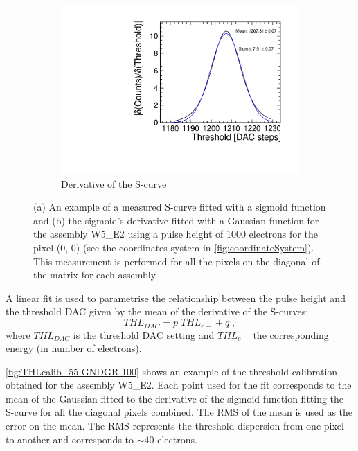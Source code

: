 \begin{figure}[htbp]
\begin{subfigure}[b]{0.45\textwidth}
    \includegraphics[width=\textwidth]{./figures/Calibration/W5_E2_deriv_scurve_ampl1.pdf}
    \caption{Derivative of the S-curve}
    \label{fig:deriv_example}
  \end{subfigure}
  \caption{(a) An example of a measured S-curve fitted with a sigmoid
    function and (b) the sigmoid's derivative fitted with a Gaussian
    function for the assembly W5\_E2 using a pulse height of 1000
    electrons for the pixel (0, 0) (see the coordinates system in
    \cref{fig:coordinateSystem}). This measurement is performed for
    all the pixels on the diagonal of the matrix for each assembly.}
  \label{fig:scurve_deriv_example}
\end{figure}

A linear fit is used to parametrise the relationship between the pulse
height and the threshold DAC given by the mean of the derivative of
the S-curves:
\begin{equation}
  THL_{DAC}=p \; THL_{e-} + q \; ,
  \label{eq:THLDAC}
\end{equation}
where $THL_{DAC}$ is the threshold DAC setting and $THL_{e-}$ the
corresponding energy (in number of electrons). 

\cref{fig:THLcalib_55-GNDGR-100} shows an example of the threshold
calibration obtained for the assembly W5\_E2. Each point used for the
fit corresponds to the mean of the Gaussian fitted to the derivative
of the sigmoid function fitting the S-curve for all the diagonal
pixels combined. The RMS of the mean is used as the error on the
mean. The RMS represents the threshold dispersion from one pixel to
another and corresponds to $\sim40$ electrons.  

